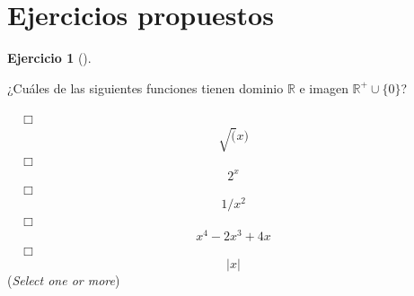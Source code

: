 \documentclass[
  a4paper,
]{scrreport}
\theoremstyle{definition}
\newtheorem{exercise}{Ejercicio}[chapter]
\theoremstyle{remark}
\begin{document}
\hypertarget{ejercicios-propuestos-1}{%
\section{Ejercicios propuestos}\label{ejercicios-propuestos-1}}

\leavevmode{}%
\begin{exercise}[]\label{exr-dominio-imagen}

¿Cuáles de las siguientes funciones tienen dominio \(\mathbb{R}\) e
imagen \(\mathbb{R}^+\cup\{0\}\)?

${\quad\Box}$ $$\sqrt(x)$$
${\quad\Box}$ $$2^x$$
${\quad\Box}$ $$1/x^2$$
${\quad\Box}$ $$x^4-2x^3+4x$$
${\quad\Box}$ $$|x|$$
(\emph{Select one or more})

\end{exercise}
\end{document}
